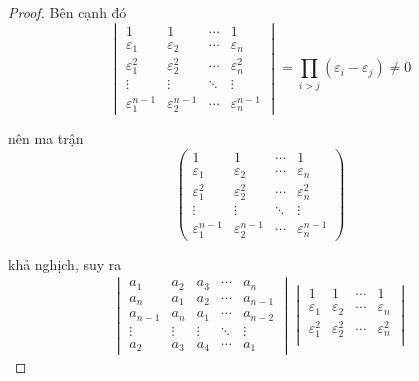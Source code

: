 \documentclass[class=nhvh-linear-algebra,crop=false]{standalone}
\begin{document}
\begin{proof}
	\par Bên cạnh đó
	\[
		\begin{vmatrix}
			1                     & 1                     & \cdots & 1                     \\
			\varepsilon_{1}       & \varepsilon_{2}       & \cdots & \varepsilon_{n}       \\
			\varepsilon_{1}^{2}   & \varepsilon_{2}^{2}   & \cdots & \varepsilon_{n}^{2}   \\
			\vdots                & \vdots                & \ddots & \vdots                \\
			\varepsilon_{1}^{n-1} & \varepsilon_{2}^{n-1} & \cdots & \varepsilon_{n}^{n-1}
		\end{vmatrix}
		= \prod_{i>j}(\varepsilon_{i} - \varepsilon_{j}) \ne 0
	\]
	\par nên ma trận
	\[
		\begin{pmatrix}
			1                     & 1                     & \cdots & 1                     \\
			\varepsilon_{1}       & \varepsilon_{2}       & \cdots & \varepsilon_{n}       \\
			\varepsilon_{1}^{2}   & \varepsilon_{2}^{2}   & \cdots & \varepsilon_{n}^{2}   \\
			\vdots                & \vdots                & \ddots & \vdots                \\
			\varepsilon_{1}^{n-1} & \varepsilon_{2}^{n-1} & \cdots & \varepsilon_{n}^{n-1}
		\end{pmatrix}
	\]
	\par khả nghịch, suy ra
	\begin{align*}
		\begin{vmatrix}
			a_{1}   & a_{2}  & a_{3}  & \cdots & a_{n}   \\
			a_{n}   & a_{1}  & a_{2}  & \cdots & a_{n-1} \\
			a_{n-1} & a_{n}  & a_{1}  & \cdots & a_{n-2} \\
			\vdots  & \vdots & \vdots & \ddots & \vdots  \\
			a_{2}   & a_{3}  & a_{4}  & \cdots & a_{1}
		\end{vmatrix}
		\begin{vmatrix}
			1                     & 1                     & \cdots & 1                     \\
			\varepsilon_{1}       & \varepsilon_{2}       & \cdots & \varepsilon_{n}       \\
			\varepsilon_{1}^{2}   & \varepsilon_{2}^{2}   & \cdots & \varepsilon_{n}^{2}   \\

\end{vmatrix}
\end{align*}
\end{proof}
\end{document}
